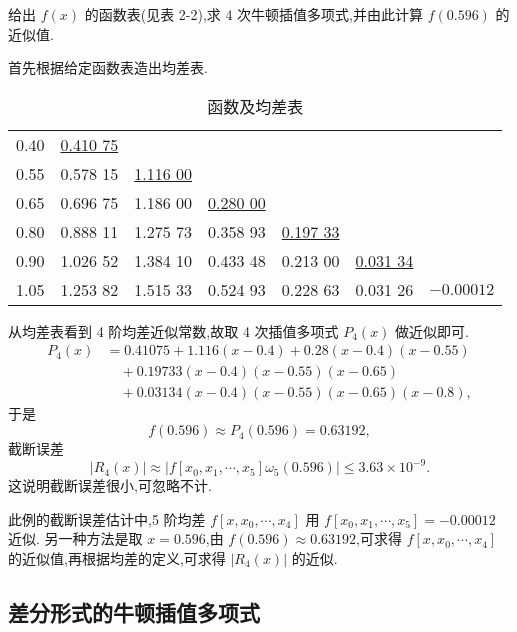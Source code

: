 \documentclass[../../main.tex]{subfiles}
\begin{document}
\begin{example}
给出 $f(x)$ 的函数表(见表 2-2),求 4 次牛顿插值多项式,并由此计算 $f(0.596)$ 的近似值.
\end{example}
\begin{solution}
首先根据给定函数表造出均差表.
\begin{table}[H]
\centering
\caption{函数及均差表}
\label{table:例题1均差表}
\begin{tabular}{c|c|c|c|c|c|c}
\hline
0.40  & \underline{0.410 75} &          &          &          &          &          \\
0.55  & 0.578 15          & \underline{1.116 00} &          &          &          &          \\
0.65  & 0.696 75          & 1.186 00          & \underline{0.280 00} &          &          &          \\
0.80  & 0.888 11          & 1.275 73          & 0.358 93          & \underline{0.197 33} &          &          \\
0.90  & 1.026 52          & 1.384 10          & 0.433 48          & 0.213 00          & \underline{0.031 34} &          \\
1.05  & 1.253 82          & 1.515 33          & 0.524 93          & 0.228 63          & 0.031 26          & $-0.000 12$ \\
\hline
\end{tabular}
\end{table}
从均差表看到 4 阶均差近似常数,故取 4 次插值多项式 $P_4(x)$ 做近似即可.
\begin{align*}
P_4(x) &= 0.41075 + 1.116(x - 0.4) + 0.28(x - 0.4)(x - 0.55) \\
&\quad + 0.19733(x - 0.4)(x - 0.55)(x - 0.65) \\
&\quad + 0.03134(x - 0.4)(x - 0.55)(x - 0.65)(x - 0.8),
\end{align*}
于是
\[
f(0.596) \approx P_4(0.596) = 0.63192,
\]
截断误差
\[
|R_4(x)| \approx |f[x_0, x_1, \cdots, x_5]\omega_5(0.596)| \leqslant 3.63 \times 10^{-9}.
\]
这说明截断误差很小,可忽略不计.

此例的截断误差估计中,5 阶均差 $f[x, x_0, \cdots, x_4]$ 用 $f[x_0, x_1, \cdots, x_5] = -0.00012$ 近似. 另一种方法是取 $x = 0.596$,由 $f(0.596) \approx 0.63192$,可求得 $f[x, x_0, \cdots, x_4]$ 的近似值,再根据均差的定义,可求得 $|R_4(x)|$ 的近似.

\end{solution}


\subsection{差分形式的牛顿插值多项式}
\end{document}
